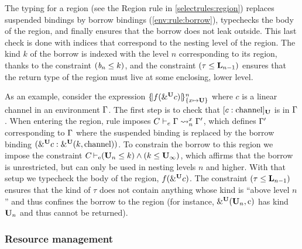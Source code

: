 The typing for a region (see the {\sc Region} rule in \cref{selectrules:region})
replaces suspended bindings by borrow bindings
(\cref{env:rule:borrow}), typechecks the body
of the region, and finally ensures that the borrow does not leak outside.
This last check is done with indices that correspond to the nesting
level of the region. The kind $k$ of the borrow is indexed with the level $n$
corresponding to its region, thanks to the constraint $(\BORROW_n\lk
k)$, and the constraint $\Cleq{\tau}{\klin_{n-1}}$ ensures that
the return type of the region must live at some enclosing, lower level.

As an example, consider the expression $\region{\Sone x\IBORROW}{f(\borrow[\IBORROW]{c})}$
where $c$ is a linear channel in an environment $\E$.
The first step is to check that $\svar[\IBORROW]{c}{\text{channel}}$
is in $\E$.
When entering the region, rule  imposes
$\lregion{C}{x}{\E}{\E'}$, which defines $\E'$
corresponding to $\E$ where the suspended binding is replaced by the
borrow binding  $\bvar{\borrow[\IBORROW]{c}}{\borrowty[\IBORROW]{k}{\text{channel}}}$.
To constrain the borrow to this region we impose the constraint
$\entail{C}{(\kun_n\lk k) \wedge (k \lk\kun_\infty)}$, which affirms
that the borrow is unrestricted, but can only be used in nesting
levels $n$ and higher.
With that setup we typecheck the body of the region,
$f(\borrow[\IBORROW]{c})$.
The constraint $\Cleq{\tau}{\klin_{n-1}}$ ensures
that the kind of $\tau$ does not contain anything whose kind is
``above level $n$'' and thus confines the borrow to the region
(for instance, $\borrowty[\IBORROW]{\kun_n}{\text{c}}$ has kind
$\kun_n$ and thus cannot be returned).







\subsubsection{Resource management}

